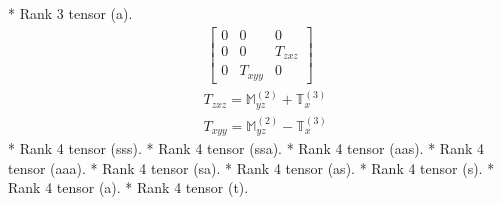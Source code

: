 \documentclass[fleqn,8pt,landscape]{jsarticle}
\begin{document}
* Rank 3 tensor (a).
\begin{align*}
\begin{bmatrix} 0 & 0 & 0 \\ 0 & 0 & T_{zxz} \\ 0 & T_{xyy} & 0 \end{bmatrix}
\end{align*}
\begin{align*}
& T_{zxz} = \mathbb{M}_{yz}^{(2)} + \mathbb{T}_{x}^{(3)} \\
& T_{xyy} = \mathbb{M}_{yz}^{(2)} - \mathbb{T}_{x}^{(3)}
\end{align*}
* Rank 4 tensor (sss).
* Rank 4 tensor (ssa).
* Rank 4 tensor (aas).
* Rank 4 tensor (aaa).
* Rank 4 tensor (sa).
* Rank 4 tensor (as).
* Rank 4 tensor (s).
* Rank 4 tensor (a).
* Rank 4 tensor (t).
\end{document}
